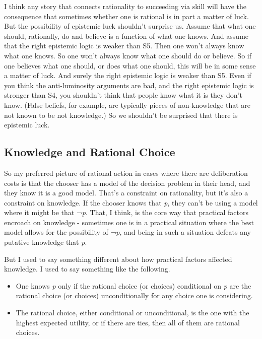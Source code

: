 \documentclass[
  10pt,
  letterpaper,
  DIV=11,
  numbers=noendperiod,
  twoside]{scrartcl}
\providecommand{\tightlist}{%
  \setlength{\itemsep}{0pt}\setlength{\parskip}{0pt}}\usepackage{longtable,booktabs,array}
\begin{document}
I think any story that connects rationality to succeeding via skill will
have the consequence that sometimes whether one is rational is in part a
matter of luck. But the possibility of epistemic luck shouldn't surprise
us. Assume that what one should, rationally, do and believe is a
function of what one knows. And assume that the right epistemic logic is
weaker than S5. Then one won't always know what one knows. So one won't
always know what one should do or believe. So if one believes what one
should, or does what one should, this will be in some sense a matter of
luck. And surely the right epistemic logic is weaker than S5. Even if
you think the anti-luminosity arguments are bad, and the right epistemic
logic is stronger than S4, you shouldn't think that people know what it
is they don't know. (False beliefs, for example, are typically pieces of
non-knowledge that are not known to be not knowledge.) So we shouldn't
be surprised that there is epistemic luck.

\subsection{Knowledge and Rational Choice}\label{knowledge}

So my preferred picture of rational action in cases where there are
deliberation costs is that the chooser has a model of the decision
problem in their head, and they know it is a good model. That's a
constraint on rationality, but it's also a constraint on knowledge. If
the chooser knows that \emph{p}, they can't be using a model where it
might be that ¬\emph{p}. That, I think, is the core way that practical
factors encroach on knowledge - sometimes one is in a practical
situation where the best model allows for the possibility of ¬\emph{p},
and being in such a situation defeats any putative knowledge that
\emph{p}.

But I used to say something different about how practical factors
affected knowledge. I used to say something like the following.

\begin{itemize}
\tightlist
\item
  One knows \emph{p} only if the rational choice (or choices)
  conditional on \emph{p} are the rational choice (or choices)
  unconditionally for any choice one is considering.
\item
  The rational choice, either conditional or unconditional, is the one
  with the highest expected utility, or if there are ties, then all of
  them are rational choices.
\end{itemize}
\end{document}
